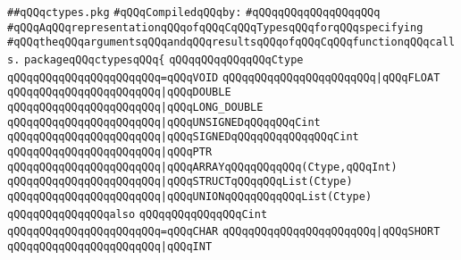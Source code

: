 \label{src/lib/compiler/back/low/ccalls/ctypes.pkg}
\verb|##qQQqctypes.pkg|\newline
\newline
\verb|#qQQqCompiledqQQqby:|\newline
\verb|#qQQqqQQqqQQqqQQqqQQq|\newline
\newline
\newline
\newline
\verb|#qQQqAqQQqrepresentationqQQqofqQQqCqQQqTypesqQQqforqQQqspecifying|\newline
\verb|#qQQqtheqQQqargumentsqQQqandqQQqresultsqQQqofqQQqCqQQqfunctionqQQqcalls.|\newline
\newline
\newline
\verb|packageqQQqctypesqQQq{|\newline
\newline
\verb|qQQqqQQqqQQqqQQqCtype|\newline
\verb|qQQqqQQqqQQqqQQqqQQqqQQq=qQQqVOID|\newline
\verb|qQQqqQQqqQQqqQQqqQQqqQQq|\verb#|qQQqFLOAT#\newline
\verb|qQQqqQQqqQQqqQQqqQQqqQQq|\verb#|qQQqDOUBLE#\newline
\verb|qQQqqQQqqQQqqQQqqQQqqQQq|\verb#|qQQqLONG_DOUBLE#\newline
\verb|qQQqqQQqqQQqqQQqqQQqqQQq|\verb#|qQQqUNSIGNEDqQQqqQQqCint#\newline
\verb|qQQqqQQqqQQqqQQqqQQqqQQq|\verb#|qQQqSIGNEDqQQqqQQqqQQqqQQqCint#\newline
\verb|qQQqqQQqqQQqqQQqqQQqqQQq|\verb#|qQQqPTR#\newline
\verb|qQQqqQQqqQQqqQQqqQQqqQQq|\verb#|qQQqARRAYqQQqqQQqqQQq(Ctype,qQQqInt)#\newline
\verb|qQQqqQQqqQQqqQQqqQQqqQQq|\verb#|qQQqSTRUCTqQQqqQQqList(Ctype)#\newline
\verb|qQQqqQQqqQQqqQQqqQQqqQQq|\verb#|qQQqUNIONqQQqqQQqqQQqList(Ctype)#\newline
\newline
\verb|qQQqqQQqqQQqqQQqalso|\newline
\verb|qQQqqQQqqQQqqQQqCint|\newline
\verb|qQQqqQQqqQQqqQQqqQQqqQQq=qQQqCHAR|\newline
\verb|qQQqqQQqqQQqqQQqqQQqqQQq|\verb#|qQQqSHORT#\newline
\verb|qQQqqQQqqQQqqQQqqQQqqQQq|\verb#|qQQqINT#\newline
